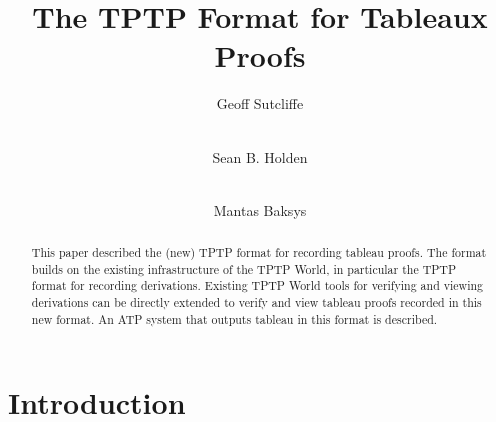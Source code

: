 \documentclass[runningheads]{llncs}
\begin{document}
\title{The TPTP Format for Tableaux Proofs}

\author{
Geoff Sutcliffe\Envelope
\and
\\ Sean B. Holden
\and
\\ Mantas Baksys
}

\maketitle
\begin{abstract}
This paper described the (new) TPTP format for recording tableau proofs.
The format builds on the existing infrastructure of the TPTP World, in particular the TPTP format
for recording derivations.
Existing TPTP World tools for verifying and viewing derivations can be directly extended to
verify and view tableau proofs recorded in this new format.
An ATP system that outputs tableau in this format is described.
\end{abstract}
\section{Introduction}
\label{Introduction}
\end{document}

